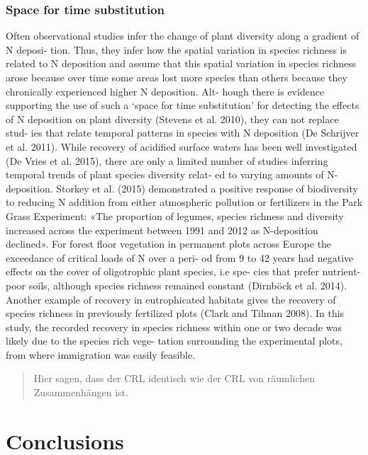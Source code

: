 \documentclass[fleqn,10pt,lineno]{wlpeerj} %
\theoremstyle{definition}
\theoremstyle{definition}
\theoremstyle{definition}
\theoremstyle{remark}
\begin{document}
\subsubsection{Space for time
substitution}\label{space-for-time-substitution}

Often observational studies infer the change of plant diversity along a
gradient of N deposi- tion. Thus, they infer how the spatial variation
in species richness is related to N deposition and assume that this
spatial variation in species richness arose because over time some areas
lost more species than others because they chronically experienced
higher N deposition. Alt- hough there is evidence supporting the use of
such a `space for time substitution' for detecting the effects of N
deposition on plant diversity (Stevens et al. 2010), they can not
replace stud- ies that relate temporal patterns in species with N
deposition (De Schrijver et al. 2011). While recovery of acidified
surface waters has been well investigated (De Vries et al. 2015), there
are only a limited number of studies inferring temporal trends of plant
species diversity relat- ed to varying amounts of N-deposition. Storkey
et al. (2015) demonstrated a positive response of biodiversity to
reducing N addition from either atmospheric pollution or fertilizers in
the Park Grass Experiment: «The proportion of legumes, species richness
and diversity increased across the experiment between 1991 and 2012 as
N-deposition declined». For forest floor vegetation in permanent plots
across Europe the exceedance of critical loads of N over a peri- od from
9 to 42 years had negative effects on the cover of oligotrophic plant
species, i.e spe- cies that prefer nutrient-poor soils, although species
richness remained constant (Dirnböck et al. 2014). Another example of
recovery in eutrophicated habitats gives the recovery of species
richness in previously fertilized plots (Clark and Tilman 2008). In this
study, the recorded recovery in species richness within one or two
decade was likely due to the species rich vege- tation surrounding the
experimental plots, from where immigration was easily feasible.

\begin{quote}
Hier sagen, dass der CRL identisch wie der CRL von räumlichen
Zusammenhängen ist.
\end{quote}

\section*{Conclusions}\label{conclusions}
\end{document}
